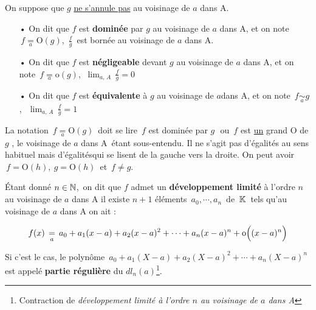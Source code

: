 \noindent On suppose que $g$ \underline{ne s'annule pas} au voisinage de $a$ dans A.
\begin{itemize}
    \item[•] On dit que $f$ est \textbf{dominée} par $g$ au voisinage de $a$ dans A, et on note \(\,f\underset{a}{=}\mathrm{O}(g)\), \ssi \(\displaystyle\,\frac{f}{g}\,\) est bornée au voisinage de $a$ dans A.\vspace{0.2cm}
    
    \item[•] On dit que $f$ est \textbf{négligeable} devant $g$ au voisinage de $a$ dans A, et on note \(\,f\underset{a}{=}\mathrm{o}(g)\), \ssi \(\ \displaystyle \lim_{a,\,A}\,\frac{f}{g}=0\)\vspace{0.2cm}
    
    \item[•] On dit que $f$ est \textbf{équivalente} à $g$ au voisinage de $a $dans A, et on note \(\,f \underset{a}{\sim}g\),\, \ssi \(\ \displaystyle \lim_{a,\,A}\, \frac{f}{g}=1\)
\end{itemize}
\vspace{0.3cm}
\begin{small}
    \noindent La notation \(\,f\underset{a}{=}\mathrm{O}(g)\,\) doit se lire \guillemetleft $\,f$ est dominée par $g\,$\guillemetright\, ou \guillemetleft $\,f$ est \underline{un} grand O de $g\,$\guillemetright\,, le \guillemetleft voisinage de $a$ dans A\guillemetright\, étant sous-entendu. Il ne s'agit pas d'égalités au sens habituel mais \guillemetleft d'égalités\guillemetright\;qui se lisent de la gauche vers la droite. On peut avoir \(\,f=\mathrm{O}(h),\ g=\mathrm{O}(h)\,\) et \(\,f\neq g\).
\end{small}

\vspace{1.2cm}

Étant donné \(n\in\mathbb{N}\),\, on dit que $f$ admet un \textbf{développement limité} à l'ordre $n$ au voisinage de $a$ dans A \ssi il existe $n+1$ éléments \(\, a_0,\cdots,a_n\,\) de \(\,\mathbb{K}\,\) tels qu'au voisinage de $a$ dans A on ait :\vspace{-0.3cm}

\[f(x)\,\underset{a}{=}\,a_0+a_1(x-a)+a_2(x-a)^2+\cdots+a_n(x-a)^n+\mathrm{o}\Bigl((x-a)^n\Bigr)\]

Si c'est le cas, le polynôme \(\,a_0+a_1(X-a)+a_2(X-a)^2+\cdots+a_n(X-a)^n\,\) est appelé \textbf{partie régulière} du $dl_n(a)$\footnote{Contraction de \textit{développement limité à l'ordre $n$ au voisinage de $a$ dans A}}.

